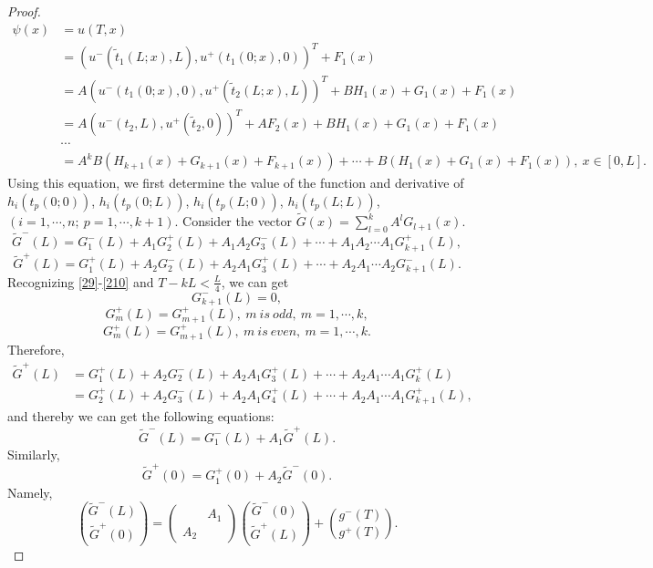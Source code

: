 \documentclass[a4paper,reqno,11pt]{amsart}
\numberwithin{equation}{section} %
\begin{document}
\begin{proof}
\begin{equation}\label{F}
	\begin{aligned}
	\psi\left( x \right) &=u(T,x) \\
							   &=(u^- (\tilde{t} _1(L;x) ,L) ,u^+ (t _1(0;x),0))^T + F_1(x)\\
							   &=A(u^- (t _1(0;x) ,0) ,u^+ (\tilde{t} _2 (L;x),L))^T + BH _1(x)+G_1(x)+F_1(x)\\
							   &=A(u^- (t _2 ,L) ,u^+ (\tilde{t} _2 ,0))^T +AF_2(x)+ BH _1(x)+G_1(x)+F_1(x)\\
							   & \cdots \\
							   &=A^kB(H_{k+1}\left( x \right)+G_{k+1}\left( x \right)+F_{k+1}\left( x \right)) +\cdots  +B(H_1\left( x \right)+G_1\left( x \right)+F_1\left( x \right)) ,\ x\in \left[ 0,L \right].
	\end{aligned}
	\end{equation}
Using this equation, we first determine the value of the function and derivative of $h_i(t_p(0;0))$, $h_i(t_p(0;L))$, $h_i(t_p(L;0))$, $h_i(t_p(L;L))$, $(i=1,\cdots,n;\ p=1,\cdots,k+1)$.
Consider the vector $\tilde{G}  (x) = \sum_{l=0}^k A^l G _{l+1}(x)$.
$$
\tilde{G}^-  (L) =G^- _1 (L) +A_1 G^+ _2 (L) +A_1 A_2 G^- _3 (L)  +\cdots +A_1 A_2 \cdots A_1 G^+ _{k+1} (L) ,
$$
$$
\tilde{G}^+  (L) =G^+ _1 (L) +A_2 G^- _2 (L) +A_2 A_1 G^+ _3 (L)  +\cdots +A_2 A_1 \cdots A_2 G^- _{k+1} (L) .
$$
Recognizing \eqref{29}-\eqref{210} and $T-kL < \frac{L}{4}$, we can get 
$$
G^- _{k+1}(L)=0,
$$
$$
G^+ _{m}(L) =G^+ _{m+1}(L) ,\ m\ is\ odd ,\ m=1,\cdots ,k,
$$
$$
G^+ _{m}(L) =G^+ _{m+1}(L) ,\ m\ is\ even ,\ m=1,\cdots ,k.
$$
Therefore,
\begin{equation}
	\begin{aligned}
		\tilde{G}^+  (L) &=G^+ _1 (L) +A_2 G^- _2 (L) +A_2 A_1 G^+ _3 (L)  +\cdots +A_2 A_1 \cdots A_1 G^+ _{k} (L) \\
		                 &=G^+ _2 (L) +A_2 G^- _3 (L) +A_2 A_1 G^+ _4 (L)  +\cdots +A_2 A_1 \cdots A_1 G^+ _{k+1} (L) ,
	\end{aligned}
\end{equation}
and thereby we can get the following equations:
$$
\tilde{G}^-  (L) =G^- _1 (L) +A_1 \tilde{G} ^+  (L) .
$$
Similarly,
$$
\tilde{G}^+  (0) =G^+ _1 (0) +A_2 \tilde{G} ^-  (0) .
$$
Namely, 
\begin{equation}\label{20}
    \binom{\tilde{G} ^{-}(L)}{\tilde{G}^{+}(0)}=\left(\begin{array}{ll} 
        & A_1 \\
        A_2 &
    \end{array}\right)\binom{\tilde{G}^{-}(0)}{\tilde{G} ^{+}(L)}+ \binom{g ^{-}(T)}{g ^{+}(T)}.

\end{equation}
\end{proof}
\end{document}
